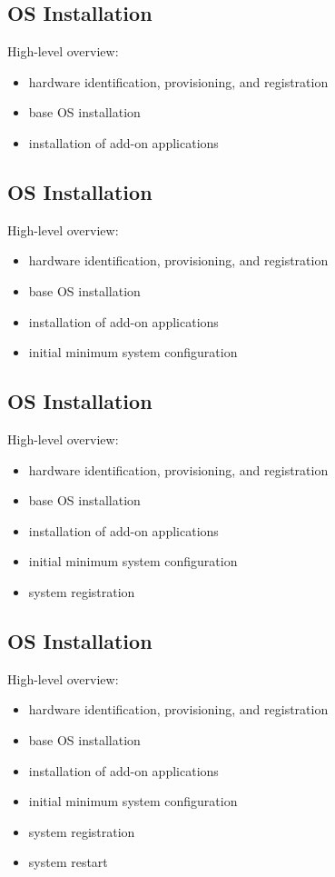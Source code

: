 \documentclass[xga]{xdvislides}
\begin{document}
\subsection{OS Installation}
High-level overview:
\begin{itemize}
	\item hardware identification, provisioning, and registration
	\item base OS installation
	\item installation of add-on applications
\end{itemize}

\subsection{OS Installation}
High-level overview:
\begin{itemize}
	\item hardware identification, provisioning, and registration
	\item base OS installation
	\item installation of add-on applications
	\item initial minimum system configuration
\end{itemize}

\subsection{OS Installation}
High-level overview:
\begin{itemize}
	\item hardware identification, provisioning, and registration
	\item base OS installation
	\item installation of add-on applications
	\item initial minimum system configuration
	\item system registration
\end{itemize}

\subsection{OS Installation}
High-level overview:
\begin{itemize}
	\item hardware identification, provisioning, and registration
	\item base OS installation
	\item installation of add-on applications
	\item initial minimum system configuration
	\item system registration
	\item system restart
\end{itemize}
\end{document}
